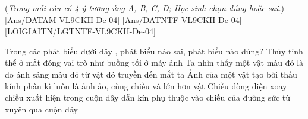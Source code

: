 (\textit{Trong mỗi câu có 4 ý tương ứng A, B, C, D; Học sinh chọn đúng hoặc sai.})
[Ans/DATAM-VL9CKII-De-04]
[Ans/DATNTF-VL9CKII-De-04]
\LGexTF
{}[LOIGIAITN/LGTNTF-VL9CKII-De-04]
\begin{ex}
	Trong các phát biểu dưới đây , phát biểu nào sai, phát biểu nào đúng?
	\choiceTF
	{Thủy tinh thể ở mắt đóng vai trò như buồng tối ở máy ảnh}
	{Ta nhìn thấy một vật màu đỏ là do ánh sáng màu đỏ từ vật đó truyền đến mắt ta}
	{Ảnh của một vật tạo bởi thấu kính phân kì luôn là ảnh ảo, cùng chiều và lớn hơn vật}
	{\True Chiều dòng điện xoay chiều xuất hiện trong cuộn dây dẫn kín phụ thuộc vào chiều của đường sức từ xuyên qua cuộn dây}
	\loigiai{}
\end{ex}


